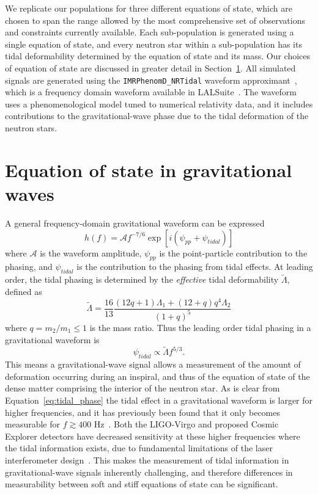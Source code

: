 We replicate our populations for three different equations of state, which are chosen to span the range allowed by the most comprehensive set of observations and constraints currently available. Each sub-population is generated using a single equation of state, and every neutron star within a sub-population has its tidal deformability determined by the equation of state and its mass. Our choices of equation of state are discussed in greater detail in Section~\ref{sec:eos}.
All simulated signals are generated using the \texttt{IMRPhenomD\_NRTidal} waveform approximant~\cite{Husa:2015iqa,Khan:2015jqa,Dietrich:2017aum}, which is a frequency domain waveform available in LALSuite~\cite{2020ascl.soft12021L}. The waveform uses a phenomenological model tuned to numerical relativity data, and it includes contributions to the gravitational-wave phase due to the tidal deformation of the neutron stars.

\section{Equation of state in gravitational waves}\label{sec:eos}

A general frequency-domain gravitational waveform can be expressed
\begin{equation}
    h(f)=\mathcal{A}f^{-7/6}\exp[i(\psi_{pp}+\psi_{tidal})]
\end{equation}
where $\mathcal{A}$ is the waveform amplitude, $\psi_{pp}$ is the point-particle contribution to the phasing, and $\psi_{tidal}$ is the contribution to the phasing from tidal effects. At leading order, the tidal phasing is determined by the \emph{effective} tidal deformability $\tilde\Lambda$, defined as
\begin{equation}
    \tilde\Lambda=\frac{16}{13}\frac{(12q+1)\Lambda_{1}+(12+q)q^{4}\Lambda_{2}}{(1+q)^{5}}
\end{equation}
where $q=m_{2}/m_{1}\leq1$ is the mass ratio. Thus the leading order tidal phasing in a gravitational waveform is
\begin{equation}\label{eq:tidal_phase}
    \psi_{tidal} \propto \tilde\Lambda f^{5/3}.
\end{equation}
This means a gravitational-wave signal allows a measurement of the amount of deformation occurring during an inspiral, and thus of the equation of state of the dense matter comprising the interior of the neutron star.
As is clear from Equation~\ref{eq:tidal_phase} the tidal effect in a gravitational waveform is larger for higher frequencies, and it has previously been found that it only becomes measurable for $f\gtrsim400$ Hz~\cite{Harry:2018hke}. Both the LIGO-Virgo and proposed Cosmic Explorer detectors have decreased sensitivity at these higher frequencies where the tidal information exists, due to fundamental limitations of the laser interferometer design~\cite{Caves:1981hw}. This makes the measurement of tidal information in gravitational-wave signals inherently challenging, and therefore differences in measurability between soft and stiff equations of state can be significant.

